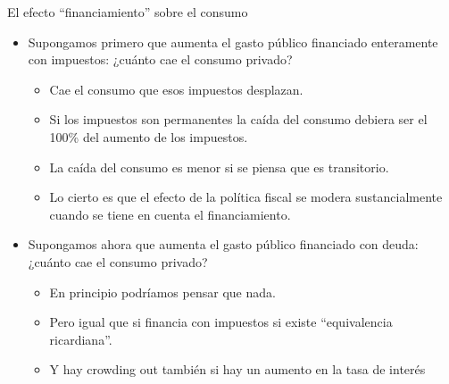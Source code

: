 \documentclass{beamer}
\begin{document}
\begin{frame}{El efecto “financiamiento” sobre el consumo}
    
    \begin{itemize}
        \item Supongamos primero que aumenta el gasto público financiado enteramente con impuestos: ¿cuánto cae el consumo privado?
        \begin{itemize}
            \item Cae el consumo que esos impuestos desplazan. 
            \item Si los impuestos son permanentes la caída del consumo debiera ser el 100\% del aumento de los impuestos.
            \item La caída del consumo es menor si se piensa que es transitorio.
            \item Lo cierto es que el efecto de la política fiscal se modera sustancialmente cuando se tiene en cuenta el financiamiento.
        \end{itemize}
        \item Supongamos ahora que aumenta el gasto público financiado con deuda: ¿cuánto cae el consumo privado?
        \begin{itemize}
            \item En principio podríamos pensar que nada.
            \item Pero igual que si financia con impuestos si existe “equivalencia ricardiana”.
            \item Y hay crowding out también si hay un aumento en la tasa de interés
        \end{itemize}
    \end{itemize}

\end{frame}

\end{document}
